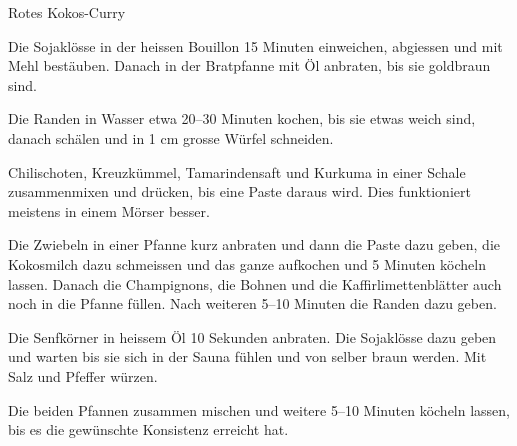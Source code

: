 
\begin{recipe}[]{Rotes Kokos-Curry}{}{}



\step%
Die Sojakl\"osse in der heissen Bouillon 15 Minuten einweichen, abgiessen und
mit Mehl best\"auben. Danach in der Bratpfanne mit \"Ol anbraten, bis sie
goldbraun sind.

\step%
Die Randen in Wasser etwa 20--30 Minuten kochen, bis sie etwas weich sind,
danach sch\"alen und in 1 cm grosse W\"urfel schneiden.

\step%
Chilischoten, Kreuzk\"ummel, Tamarindensaft und Kurkuma in einer Schale
zusammenmixen und dr\"ucken, bis eine Paste daraus wird. Dies funktioniert
meistens in einem M\"orser besser.

\step%
Die Zwiebeln in einer Pfanne kurz anbraten und dann die Paste dazu geben, die
Kokosmilch dazu schmeissen und das ganze aufkochen und 5 Minuten k\"ocheln
lassen. Danach die Champignons, die Bohnen und die Kaffirlimettenbl\"atter auch
noch in die Pfanne f\"ullen. Nach weiteren 5--10 Minuten die Randen dazu geben.


\step%
Die Senfk\"orner in heissem \"Ol 10 Sekunden anbraten. Die Sojakl\"osse dazu
geben und warten bis sie sich in der Sauna f\"uhlen und von selber braun
werden. Mit Salz und Pfeffer w\"urzen.

\step%
Die beiden Pfannen zusammen mischen und weitere 5--10 Minuten k\"ocheln lassen,
bis es die gew\"unschte Konsistenz erreicht hat.


\end{recipe}
